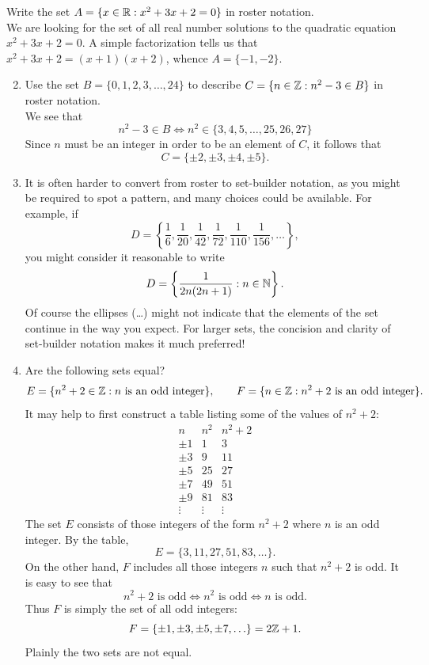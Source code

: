 \begin{examples}{}{}
\exstart Write the set $A=\{x\in\mathbb{R}:x^2+3x+2=0\}$ in roster notation.\\[5pt]
	We are looking for the set of all real number solutions to the quadratic equation $x^2+3x+2=0$. A simple factorization tells us that $x^2+3x+2=(x+1)(x+2)$, whence $A=\{-1,-2\}$.
	\begin{enumerate}\setcounter{enumi}{1}
  \item Use the set $B=\{0,1,2,3,\ldots,24\}$ to describe $C=\{n\in\mathbb{Z}:n^2-3\in B\}$ in roster notation.\\[5pt]
  We see that
  \[n^2-3\in B\iff n^2\in\{3,4,5,\ldots,25,26,27\}\]
  Since $n$ must be an integer in order to be an element of $C$, it follows that
  \[C=\{\pm 2,\pm 3,\pm 4,\pm 5\}.\]
  \item It is often harder to convert from roster to set-builder notation, as you might be required to spot a pattern, and many choices could be available. For example, if
  \[D=\left\{\frac 16,\frac 1{20},\frac 1{42},\frac 1{72},\frac 1{110},\frac 1{156},\ldots\right\},\]
  you might consider it reasonable to write
  \[D=\left\{\frac 1{2n(2n+1)}:n\in\mathbb{N}\right\}.\]
  Of course the ellipses (\ldots) might not indicate that the elements of the set continue in the way you expect. For larger sets, the concision and clarity of set-builder notation makes it much preferred!
  \item Are the following sets equal?
  \[E=\{n^2+2\in\mathbb{Z}:\text{$n$ is an odd integer}\},\qquad F=\{n\in\mathbb{Z}:n^2+2\text{ is an odd integer}\}.\]
  It may help to first construct a table listing some of the values of $n^2+2$:
  \[\begin{array}{c|c|c}
  n&n^2&n^2+2\\\hline
  \pm 1&1&3\\
  \pm 3&9&11\\
  \pm 5&25&27\\
  \pm 7&49&51\\
  \pm 9&81&83\\[-5pt]
  \vdots&\vdots&\vdots
  \end{array}\]
  The set $E$ consists of those integers of the form $n^2+2$ where $n$ is an odd integer. By the table,
  \[E=\{3,11,27,51,83,\ldots\}.\]
  On the other hand, $F$ includes all those integers $n$ such that $n^2+2$ is odd. It is easy to see that
  \[n^2+2\text{ is odd}\iff n^2\text{ is odd}\iff n\text{ is odd.}\]
  Thus $F$ is simply the set of all odd integers:
  \[F=\{\pm 1,\pm 3,\pm 5,\pm 7,\ldots\}=2\mathbb{Z}+1.\]
  Plainly the two sets are not equal.
	\end{enumerate}
\end{examples}


